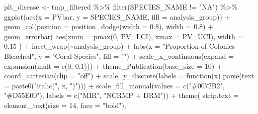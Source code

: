 \documentclass[
]{article}
\newenvironment{Shaded}{\begin{snugshade}}{\end{snugshade}}
\newcommand{\AttributeTok}[1]{\textcolor[rgb]{0.40,0.45,0.13}{#1}}
\newcommand{\ControlFlowTok}[1]{\textcolor[rgb]{0.00,0.23,0.31}{#1}}
\newcommand{\DecValTok}[1]{\textcolor[rgb]{0.68,0.00,0.00}{#1}}
\newcommand{\FloatTok}[1]{\textcolor[rgb]{0.68,0.00,0.00}{#1}}
\newcommand{\FunctionTok}[1]{\textcolor[rgb]{0.28,0.35,0.67}{#1}}
\newcommand{\NormalTok}[1]{\textcolor[rgb]{0.00,0.23,0.31}{#1}}
\newcommand{\OtherTok}[1]{\textcolor[rgb]{0.00,0.23,0.31}{#1}}
\newcommand{\SpecialCharTok}[1]{\textcolor[rgb]{0.37,0.37,0.37}{#1}}
\newcommand{\StringTok}[1]{\textcolor[rgb]{0.13,0.47,0.30}{#1}}
\begin{document}
\begin{Shaded}
\begin{Highlighting}[]
\NormalTok{plt\_disease }\OtherTok{\textless{}{-}}\NormalTok{ tmp\_filtered }\SpecialCharTok{\%\textgreater{}\%}
  \FunctionTok{filter}\NormalTok{(SPECIES\_NAME }\SpecialCharTok{!=} \StringTok{"NA"}\NormalTok{) }\SpecialCharTok{\%\textgreater{}\%}
  \FunctionTok{ggplot}\NormalTok{(}\FunctionTok{aes}\NormalTok{(}\AttributeTok{x =}\NormalTok{ PVbar, }\AttributeTok{y =}\NormalTok{ SPECIES\_NAME, }\AttributeTok{fill =}\NormalTok{ analysis\_group)) }\SpecialCharTok{+}
  \FunctionTok{geom\_col}\NormalTok{(}\AttributeTok{position =} \FunctionTok{position\_dodge}\NormalTok{(}\AttributeTok{width =} \FloatTok{0.8}\NormalTok{), }\AttributeTok{width =} \FloatTok{0.8}\NormalTok{) }\SpecialCharTok{+}
  \FunctionTok{geom\_errorbar}\NormalTok{(}
    \FunctionTok{aes}\NormalTok{(}\AttributeTok{xmin =} \FunctionTok{pmax}\NormalTok{(}\DecValTok{0}\NormalTok{, PV\_LCI), }\AttributeTok{xmax =}\NormalTok{ PV\_UCI),}
    \AttributeTok{width =} \FloatTok{0.15}
\NormalTok{  ) }\SpecialCharTok{+}
  \FunctionTok{facet\_wrap}\NormalTok{(}\SpecialCharTok{\textasciitilde{}}\NormalTok{analysis\_group) }\SpecialCharTok{+}
    \FunctionTok{labs}\NormalTok{(}\AttributeTok{x =} \StringTok{"Proportion of Colonies Bleached"}\NormalTok{, }\AttributeTok{y =} \StringTok{"Coral Species"}\NormalTok{, }\AttributeTok{fill =} \StringTok{""}\NormalTok{) }\SpecialCharTok{+}
    \FunctionTok{scale\_x\_continuous}\NormalTok{(}\AttributeTok{expand =} \FunctionTok{expansion}\NormalTok{(}\AttributeTok{mult =} \FunctionTok{c}\NormalTok{(}\DecValTok{0}\NormalTok{, }\FloatTok{0.1}\NormalTok{))) }\SpecialCharTok{+}
        \FunctionTok{theme\_Publication}\NormalTok{(}\AttributeTok{base\_size =} \DecValTok{10}\NormalTok{) }\SpecialCharTok{+}
    \FunctionTok{coord\_cartesian}\NormalTok{(}\AttributeTok{clip =} \StringTok{"off"}\NormalTok{) }\SpecialCharTok{+}
        \FunctionTok{scale\_y\_discrete}\NormalTok{(}\AttributeTok{labels =} \ControlFlowTok{function}\NormalTok{(x) }\FunctionTok{parse}\NormalTok{(}\AttributeTok{text =} \FunctionTok{paste0}\NormalTok{(}\StringTok{"italic(\textquotesingle{}"}\NormalTok{, x, }\StringTok{"\textquotesingle{})"}\NormalTok{))) }\SpecialCharTok{+}
   \FunctionTok{scale\_fill\_manual}\NormalTok{(}\AttributeTok{values =} \FunctionTok{c}\NormalTok{(}\StringTok{"\#0072B2"}\NormalTok{, }\StringTok{"\#D55E00"}\NormalTok{), }\AttributeTok{labels =} \FunctionTok{c}\NormalTok{(}\StringTok{"MIR"}\NormalTok{, }\StringTok{"NCRMP + DRM"}\NormalTok{)) }\SpecialCharTok{+}
    \FunctionTok{theme}\NormalTok{(}
          \AttributeTok{strip.text =} \FunctionTok{element\_text}\NormalTok{(}\AttributeTok{size =} \DecValTok{14}\NormalTok{, }\AttributeTok{face =} \StringTok{"bold"}\NormalTok{),}

\end{Highlighting}
\end{Shaded}
\end{document}
